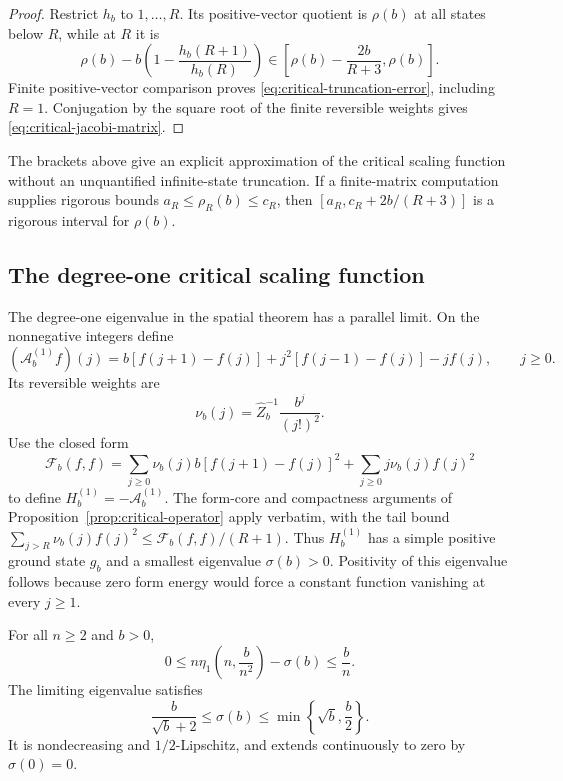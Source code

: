 \begin{proof}
Restrict $h_b$ to $1,\ldots,R$.  Its positive-vector quotient is
$\rho(b)$ at all states below $R$, while at $R$ it is
\[
 \rho(b)-b\left(1-\frac{h_b(R+1)}{h_b(R)}\right)
 \in\left[\rho(b)-\frac{2b}{R+3},\rho(b)\right].
\]
Finite positive-vector comparison proves
\eqref{eq:critical-truncation-error}, including $R=1$.  Conjugation by
the square root of the finite reversible weights gives
\eqref{eq:critical-jacobi-matrix}.
\end{proof}

The brackets above give an explicit approximation of the critical
scaling function without an unquantified infinite-state truncation.
If a finite-matrix computation supplies rigorous bounds
$a_R\leq\rho_R(b)\leq c_R$, then
$[a_R,c_R+2b/(R+3)]$ is a rigorous interval for $\rho(b)$.

\subsection{The degree-one critical scaling function}

The degree-one eigenvalue in the spatial theorem has a parallel
limit.  On the nonnegative integers define
\begin{equation}\label{eq:critical-degree-one-operator}
 (\mathcal A_b^{(1)}f)(j)
 =b[f(j+1)-f(j)]+j^2[f(j-1)-f(j)]-jf(j),
 \qquad j\geq0.
\end{equation}
Its reversible weights are
\[
 \nu_b(j)=\widehat Z_b^{-1}\frac{b^j}{(j!)^2}.
\]
Use the closed form
\[
 \mathcal F_b(f,f)
 =\sum_{j\geq0}\nu_b(j)b[f(j+1)-f(j)]^2
   +\sum_{j\geq0}j\nu_b(j)f(j)^2
\]
to define $H_b^{(1)}=-\mathcal A_b^{(1)}$.  The form-core and
compactness arguments of Proposition~\ref{prop:critical-operator}
apply verbatim, with the tail bound
$\sum_{j>R}\nu_b(j)f(j)^2\leq\mathcal F_b(f,f)/(R+1)$.
Thus $H_b^{(1)}$ has a simple positive ground state $g_b$ and a
smallest eigenvalue $\sigma(b)>0$.  Positivity of this eigenvalue
follows because zero form energy would force a constant function
vanishing at every $j\geq1$.

\begin{proposition}
\label{prop:critical-degree-one}
For all $n\geq2$ and $b>0$,
\begin{equation}\label{eq:critical-degree-one-error}
 0\leq n\eta_1\left(n,\frac b{n^2}\right)-\sigma(b)
 \leq\frac bn.
\end{equation}
The limiting eigenvalue satisfies
\begin{equation}\label{eq:critical-degree-one-bounds}
 \frac{b}{\sqrt b+2}\leq\sigma(b)
 \leq\min\left\{\sqrt b,\frac b2\right\}.
\end{equation}
It is nondecreasing and $1/2$-Lipschitz, and extends continuously to zero
by $\sigma(0)=0$.
\end{proposition}

